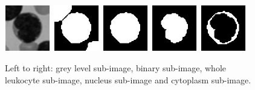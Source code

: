 \documentclass[final,a4paper,12pt,english]{UnicaPhdThesis3}
\begin{document}
{\begin{figure}[h]
	\centering
	\includegraphics[width=0.18\textwidth]{images/crop-Fig14-1}
	\includegraphics[width=0.18\textwidth]{images/crop-Fig14-2}
	\includegraphics[width=0.18\textwidth]{images/crop-Fig14-3}
	\includegraphics[width=0.18\textwidth]{images/crop-Fig15-3}
	\includegraphics[width=0.18\textwidth]{images/crop-Fig15-4}
	\caption{\label{fig:example14}Left to right: grey level sub-image, binary sub-image, whole leukocyte sub-image, nucleus sub-image and cytoplasm sub-image.}
\end{figure}

}
\end{document}
